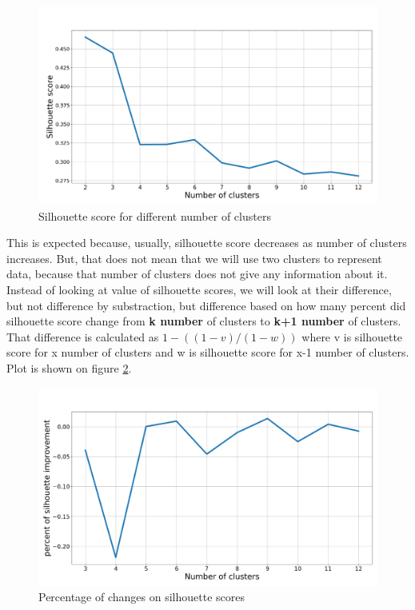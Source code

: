 \documentclass[a4paper]{article}
\begin{document}
\begin{figure}[h!]
\begin{center}
\includegraphics[scale=0.28]{num_of_clusters_shooting.png}
\end{center}
\caption{Silhouette score for different number of clusters}
\label{plt:num_cls_shooting}
\end{figure}

This is expected because, usually, silhouette score decreases as number of clusters increases. But, that does not mean that we will use two clusters to represent data, because that number of clusters does not give any information about it. Instead of looking at value of silhouette scores, we will look at their difference, but not difference by substraction, but difference based on how many percent did silhouette score change from \textbf{k number} of clusters to \textbf{k+1 number} of clusters. That difference is calculated as $ 1 - ((1 - v) / (1 - w)) $ where v is silhouette score for x number of clusters and w is silhouette score for x-1 number of clusters. Plot is shown on figure \ref{plt:num_cls_pct_change}.

\begin{figure}[h!]
\begin{center}
\includegraphics[scale=0.28]{num_of_clusters_shooting_pct_change.png}
\end{center}
\caption{Percentage of changes on silhouette scores}
\label{plt:num_cls_pct_change}
\end{figure}
\end{document}
